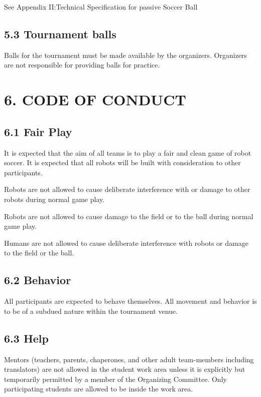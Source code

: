 \documentclass{article}
\begin{document}
\textcolor{color-5}{See Appendix II:Technical Specification for passive Soccer Ball}

\subsection{5.3 Tournament balls \label{ref-039}}

Balls for the tournament must be made available by the organizers. Organizers are not responsible for providing balls for practice.

\section{6. CODE OF CONDUCT\label{ref-040}}

\subsection{6.1 Fair Play \label{ref-041}}

It is expected that the aim of all teams is to play a fair and clean game of robot soccer. It is expected that all robots will be built with consideration to other participants. 

Robots are not allowed to cause deliberate interference with or damage to other robots during normal game play. 

Robots are not allowed to cause damage to the field or to the ball during normal game play. 

Humans are not allowed to cause deliberate interference with robots or damage to the field or the ball. 

\subsection{6.2 Behavior \label{ref-042}}

All participants are expected to behave themselves. All movement and behavior is to be of a subdued nature within the tournament venue. 

\subsection{6.3 Help \label{ref-043}}

Mentors (teachers, parents, chaperones, and other adult team-members including translators) are not allowed in the student work area unless it is explicitly but temporarily permitted by a member of the Organizing Committee. Only participating students are allowed to be inside the work area. 
\end{document}
